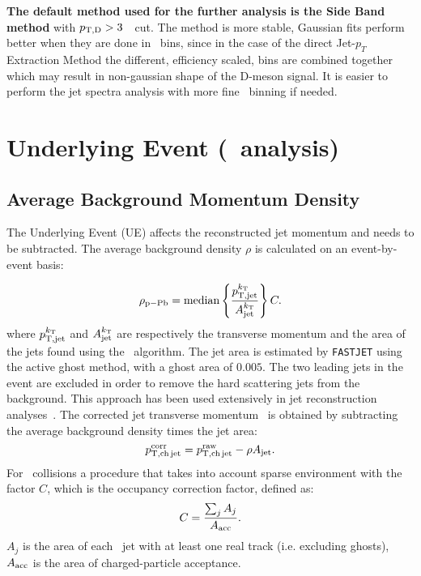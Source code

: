 {\textbf{The default method used for the further analysis is the Side Band method}} with $p_{\mathrm{T,D}}>3$~\GeVc\ cut. The method is more stable, Gaussian fits perform better when they are done in \ptd\ bins, since in the case of the direct Jet-$p_T$ Extraction Method the different, efficiency scaled, \ptd bins are combined together which may result in non-gaussian shape of the D-meson signal. It is easier to perform the jet spectra analysis with more fine \ptchjet\ binning if needed.


\section{Underlying Event (\pPb\ analysis)}
\subsection{Average Background Momentum Density}
\label{sBackSub}

The Underlying Event (UE) affects the reconstructed jet momentum and needs to be subtracted.
The average background density $\rho$ is calculated on an event-by-event basis:

\begin{equation}
\label{eq_rho_pPB}
\rho_{\rm p-Pb} = {\rm median}\left\{\frac{p_{\rm T,jet}^{k_{\mathrm{T}}}}{A_{\rm jet}^{k_{\mathrm{T}}}}\right\} C.
\end{equation}
where $p_{\rm T,jet}^{k_{\mathrm{T}}}$ and $A_{\rm jet}^{k_{\mathrm{T}}}$ are respectively the transverse momentum and the area of
the jets found using the \kt\ algorithm. 
The jet area is estimated by \texttt{FASTJET} using the active ghost method, with a ghost area of $0.005$.
The two leading jets in the event are excluded in order to remove the hard scattering jets from the background.
This approach has been used extensively in jet reconstruction analyses~\cite{ALICE:2014a, ALICE:2015a}.
The corrected jet transverse momentum \ptchjetcorr\ is obtained by subtracting the average background density times the jet area:
\begin{equation}
\label{eq_jet_backsub}
p_{\mathrm{T,ch\,jet}}^{\mathrm{corr}} = p_{\mathrm{T,ch\,jet}}^{\mathrm{raw}} - \rho A_{\rm jet}.
\end{equation}
For \pPb\ collisions a procedure that takes into account sparse environment with the factor $C$, which is the occupancy correction factor, defined as:
\begin{equation}
\label{eq_Cfac}
C = \frac{\sum_{j}A_{j}}{A_{\rm acc}}.
\end{equation}
$A_{j}$ is the area of each \kt\ jet with at least one real track (i.e. excluding ghosts), $A_{\rm acc}$ is the area of charged-particle acceptance.

